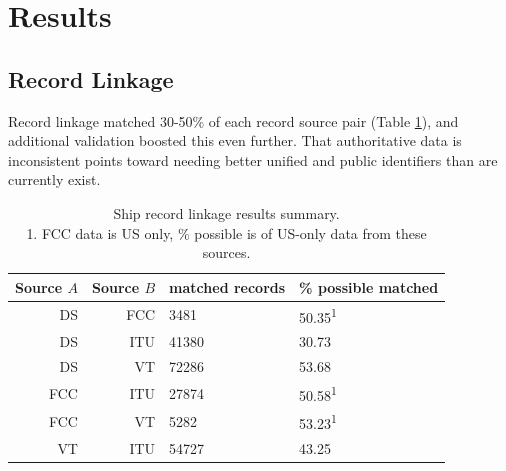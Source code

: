 \section{\textbf{Results}}



\subsection{Record Linkage}

Record linkage matched 30-50\% of each record source pair (Table \ref{table:ships-record-linkage-results-summary}), and additional validation boosted this even further. That authoritative data is inconsistent points toward needing better unified and public identifiers than are currently exist.

\begin{table}[htbp]
  \begin{tabular}{rrll} %
    \hline
    Source $A$ & Source $B$ & matched records & \% possible matched \\
    \hline
     DS & FCC &  3481 & 50.35\textsuperscript{1} \\
     DS & ITU & 41380 & 30.73 \\
     DS &  VT & 72286 & 53.68 \\
    FCC & ITU & 27874 & 50.58\textsuperscript{1} \\
    FCC &  VT &  5282 & 53.23\textsuperscript{1} \\
     VT & ITU & 54727 & 43.25 \\
  \end{tabular}
  \caption{Ship record linkage results summary. \\
    1. FCC data is US only, \% possible is of US-only data from these sources.}
  \label{table:ships-record-linkage-results-summary}
\end{table}

